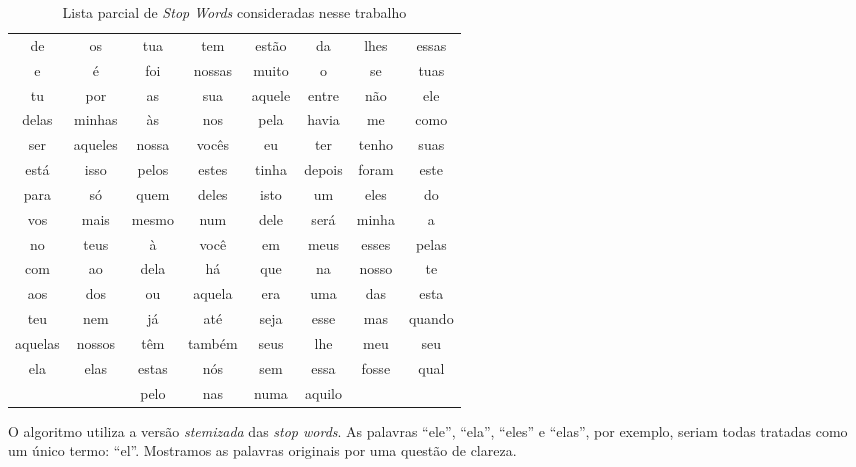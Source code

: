 \begin{table}[h]
\centering
\begin{tabular}{cccccccc}
\cline{1-8}
de & os & tua & tem & estão & da & lhes & essas \\
e & é & foi & nossas & muito & o & se & tuas \\
tu & por & as & sua & aquele & entre & não & ele \\
delas & minhas & às & nos & pela & havia & me & como \\
ser & aqueles & nossa & vocês & eu & ter & tenho & suas \\
está & isso & pelos & estes & tinha & depois & foram & este \\
para & só & quem & deles & isto & um & eles & do \\
vos & mais & mesmo & num & dele & será & minha & a \\
no & teus & à & você & em & meus & esses & pelas \\
com & ao & dela & há & que & na & nosso & te \\
aos & dos & ou & aquela & era & uma & das & esta \\
teu & nem & já & até & seja & esse & mas & quando \\
aquelas & nossos & têm & também & seus & lhe & meu & seu \\
ela & elas & estas & nós & sem & essa & fosse & qual \\
& & pelo & nas & numa & aquilo & & \\
\cline{1-8}
\end{tabular}
\caption{Lista parcial de \textit{Stop Words} consideradas nesse trabalho}
\label{exemplos-stop-words}
\end{table}

O algoritmo utiliza a versão \textit{stemizada} das \textit{stop words}. As palavras ``ele'', ``ela'', ``eles'' e ``elas'', por exemplo, seriam todas tratadas como um único termo: ``el''. Mostramos as palavras originais por uma questão de clareza.
